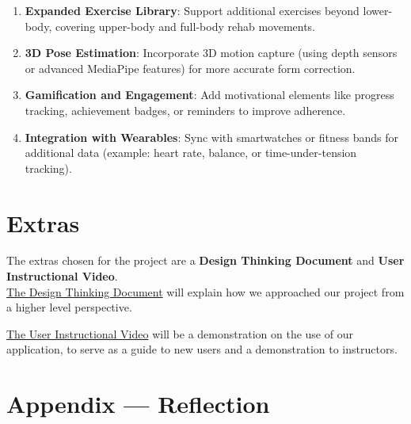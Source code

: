 \documentclass{article}
\begin{document}
\begin{enumerate}
  \item \textbf{Expanded Exercise Library}: Support additional exercises beyond lower-body, covering upper-body and full-body rehab movements.

  \item \textbf{3D Pose Estimation}: Incorporate 3D motion capture (using depth sensors or advanced MediaPipe features) for more accurate form correction.
  
  \item \textbf{Gamification and Engagement}: Add motivational elements like progress tracking, achievement badges, or reminders to improve adherence.
  
  \item \textbf{Integration with Wearables}: Sync with smartwatches or fitness bands for additional data (example: heart rate, balance, or time-under-tension tracking).

\end{enumerate}

\section{Extras}

The extras chosen for the project are a \textbf{Design Thinking Document}
and \textbf{User Instructional Video}. \\

\underline{The Design Thinking Document} will explain how we approached our project
from a higher level perspective. 

\underline{The User Instructional Video} will be a demonstration on the use of our
application, to serve as a guide to new users and a demonstration to
instructors.\\

\newpage{}

\section*{Appendix --- Reflection}
\end{document}
